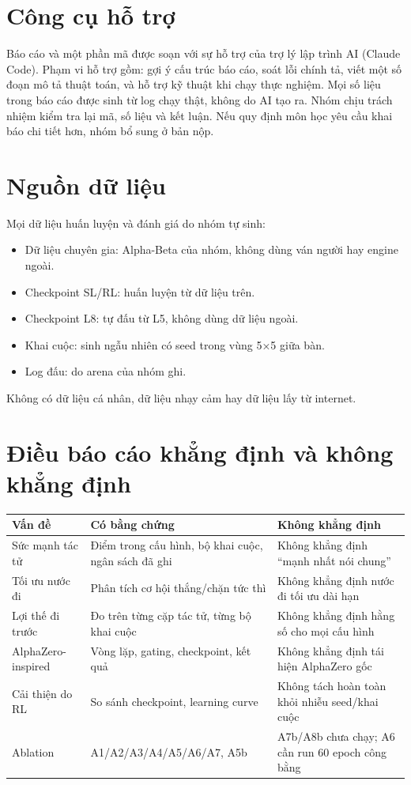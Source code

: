 \section{Công cụ hỗ trợ}
Báo cáo và một phần mã được soạn với sự hỗ trợ của trợ lý lập trình AI (Claude Code). Phạm vi hỗ
trợ gồm: gợi ý cấu trúc báo cáo, soát lỗi chính tả, viết một số đoạn mô tả thuật toán, và hỗ
trợ kỹ thuật khi chạy thực nghiệm. Mọi số liệu trong báo cáo được sinh từ log chạy thật, không
do AI tạo ra. Nhóm chịu trách nhiệm kiểm tra lại mã, số liệu và kết luận. Nếu quy định môn học
yêu cầu khai báo chi tiết hơn, nhóm bổ sung ở bản nộp.

\section{Nguồn dữ liệu}
Mọi dữ liệu huấn luyện và đánh giá do nhóm tự sinh:
\begin{itemize}
  \item Dữ liệu chuyên gia: Alpha-Beta của nhóm, không dùng ván người hay engine ngoài.
  \item Checkpoint SL/RL: huấn luyện từ dữ liệu trên.
  \item Checkpoint L8: tự đấu từ L5, không dùng dữ liệu ngoài.
  \item Khai cuộc: sinh ngẫu nhiên có seed trong vùng 5×5 giữa bàn.
  \item Log đấu: do arena của nhóm ghi.
\end{itemize}
Không có dữ liệu cá nhân, dữ liệu nhạy cảm hay dữ liệu lấy từ internet.

\section{Điều báo cáo khẳng định và không khẳng định}
\begin{center}\small
\begin{tabularx}{\textwidth}{@{}p{} X X@{}}
\toprule
\textbf{Vấn đề} & \textbf{Có bằng chứng} & \textbf{Không khẳng định} \\
\midrule
Sức mạnh tác tử & Điểm trong cấu hình, bộ khai cuộc, ngân sách đã ghi & Không khẳng định ``mạnh nhất nói chung'' \\
Tối ưu nước đi & Phân tích cơ hội thắng/chặn tức thì & Không khẳng định nước đi tối ưu dài hạn \\
Lợi thế đi trước & Đo trên từng cặp tác tử, từng bộ khai cuộc & Không khẳng định hằng số cho mọi cấu hình \\
AlphaZero-inspired & Vòng lặp, gating, checkpoint, kết quả & Không khẳng định tái hiện AlphaZero gốc \\
Cải thiện do RL & So sánh checkpoint, learning curve & Không tách hoàn toàn khỏi nhiễu seed/khai cuộc \\
Ablation & A1/A2/A3/A4/A5/A6/A7, A5b & A7b/A8b chưa chạy; A6 cần run 60 epoch công bằng \\
\bottomrule
\end{tabularx}
\end{center}

